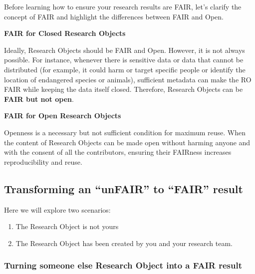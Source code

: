 \documentclass[
  letterpaper,
  DIV=11,
  numbers=noendperiod]{scrreport}
\providecommand{\tightlist}{%
  \setlength{\itemsep}{0pt}\setlength{\parskip}{0pt}}\usepackage{longtable,booktabs,array}
\begin{document}
Before learning how to ensure your research results are FAIR, let's
clarify the concept of FAIR and highlight the differences between FAIR
and Open.

\textbf{FAIR for Closed Research Objects}

Ideally, Research Objects should be FAIR and Open. However, it is not
always possible. For instance, whenever there is sensitive data or data
that cannot be distributed (for example, it could harm or target
specific people or identify the location of endangered species or
animals), sufficient metadata can make the RO FAIR while keeping the
data itself closed. Therefore, Research Objects can be \textbf{FAIR but
not open}.

\textbf{FAIR for Open Research Objects}

Openness is a necessary but not sufficient condition for maximum reuse.
When the content of Research Objects can be made open without harming
anyone and with the consent of all the contributors, ensuring their
FAIRness increases reproducibility and reuse.

\hypertarget{transforming-an-unfair-to-fair-result}{%
\subsection{Transforming an ``unFAIR'' to ``FAIR''
result}\label{transforming-an-unfair-to-fair-result}}

Here we will explore two scenarios:

\begin{enumerate}
\def\labelenumi{\arabic{enumi}.}
\tightlist
\item
  The Research Object is not yours
\item
  The Research Object has been created by you and your research team.
\end{enumerate}

\hypertarget{turning-someone-else-research-object-into-a-fair-result}{%
\subsubsection{Turning someone else Research Object into a FAIR
result}\label{turning-someone-else-research-object-into-a-fair-result}}
\end{document}
